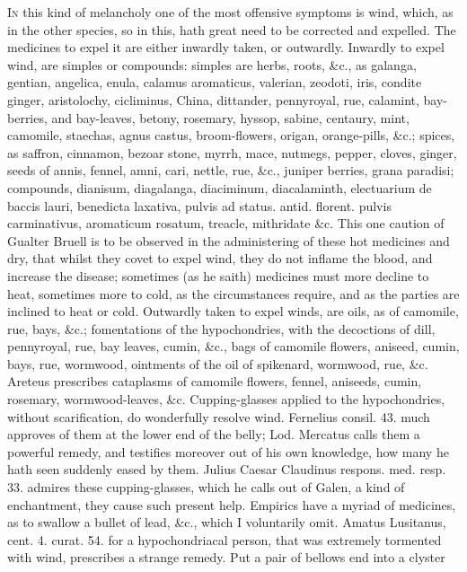 \lettrine{I}{n} this kind of melancholy one of the most offensive symptoms is wind,
which, as in the other species, so in this, hath great need to be
corrected and expelled.
The medicines to expel it are either inwardly taken, or outwardly.
Inwardly to expel wind, are simples or compounds: simples are herbs,
roots, \&c., as galanga, gentian, angelica, enula, calamus aromaticus,
valerian, zeodoti, iris, condite ginger, aristolochy, cicliminus,
China, dittander, pennyroyal, rue, calamint, bay-berries, and
bay-leaves, betony, rosemary, hyssop, sabine, centaury, mint, camomile,
staechas, agnus castus, broom-flowers, origan, orange-pills, \&c.;
spices, as saffron, cinnamon, bezoar stone, myrrh, mace, nutmegs,
pepper, cloves, ginger, seeds of annis, fennel, amni, cari, nettle,
rue, \&c., juniper berries, grana paradisi; compounds, dianisum,
diagalanga, diaciminum, diacalaminth, electuarium de baccis lauri,
benedicta laxativa, pulvis ad status. antid. florent. pulvis
carminativus, aromaticum rosatum, treacle, mithridate \&c. This one
caution of Gualter Bruell is to be observed in the administering
of these hot medicines and dry, that whilst they covet to expel wind,
they do not inflame the blood, and increase the disease; sometimes (as
he saith) medicines must more decline to heat, sometimes more to cold,
as the circumstances require, and as the parties are inclined to heat
or cold.
Outwardly taken to expel winds, are oils, as of camomile, rue, bays,
\&c.; fomentations of the hypochondries, with the decoctions of dill,
pennyroyal, rue, bay leaves, cumin, \&c., bags of camomile flowers,
aniseed, cumin, bays, rue, wormwood, ointments of the oil of spikenard,
wormwood, rue, \&c. Areteus prescribes cataplasms of camomile
flowers, fennel, aniseeds, cumin, rosemary, wormwood-leaves, \&c.
Cupping-glasses applied to the hypochondries, without
scarification, do wonderfully resolve wind. Fernelius consil. 43. much
approves of them at the lower end of the belly; Lod. Mercatus
calls them a powerful remedy, and testifies moreover out of his own
knowledge, how many he hath seen suddenly eased by them. Julius Caesar
Claudinus respons. med. resp. 33. admires these cupping-glasses, which
he calls out of Galen, a kind of enchantment, they cause such
present help.
Empirics have a myriad of medicines, as to swallow a bullet of lead,
\&c., which I voluntarily omit. Amatus Lusitanus, cent. 4. curat. 54.
for a hypochondriacal person, that was extremely tormented with wind,
prescribes a strange remedy. Put a pair of bellows end into a clyster
